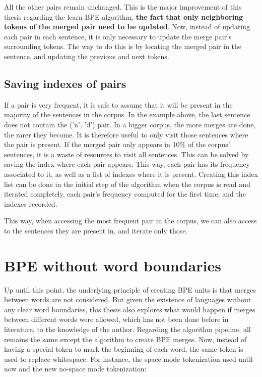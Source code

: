 All the other pairs remain unchanged. This is the major improvement of this thesis regarding the learn-BPE algorithm, \textbf{the fact that only neighboring tokens of the merged pair need to be updated}. Now, instead of updating each pair in each sentence, it is only necessary to update the merge pair's surrounding tokens. The way to do this is by locating the merged pair in the sentence, and updating the previous and next tokens.

\subsection{Saving indexes of pairs}

If a pair is very frequent, it is safe to assume that it will be present in the majority of the sentences in the corpus. In the example above, the last sentence does not contain the ('n', 'd') pair. In a bigger corpus, the more merges are done, the rarer they become. It is therefore useful to only visit those sentences where the pair is present. If the merged pair only appears in 10\% of the corpus' sentences, it is a waste of resources to visit all sentences. This can be solved by saving the index where each pair appears. This way, each pair has its frequency associated to it, as well as a list of indexes where it is present. Creating this index list can be done in the initial step of the algorithm when the corpus is read and iterated completely, each pair's frequency computed for the first time, and the indexes recorded.

This way, when accessing the most frequent pair in the corpus, we can also access to the sentences they are present in, and iterate only those.

\section{BPE without word boundaries}

Up until this point, the underlying principle of creating BPE units is that merges between words are not considered. But given the existence of languages without any clear word boundaries, this thesis also explores what would happen if merges between different words were allowed, which has not been done before in literature, to the knowledge of the author. Regarding the algorithm pipeline, all remains the same except the algorithm to create BPE merges. Now, instead of having a special token to mark the beginning of each word, the same token is used to replace whitespace. For instance, the space mode tokenization used until now and the new no-space mode tokenization:

